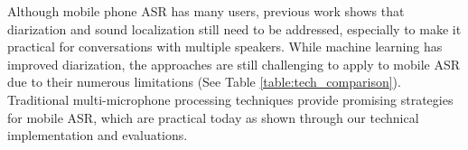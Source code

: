 Although mobile phone ASR has many users, previous work shows that diarization and sound localization still need to be addressed, especially to make it practical for conversations with multiple speakers. While machine learning has improved diarization, the approaches are still challenging to apply to mobile ASR due to their numerous limitations (See Table \ref{table:tech_comparison}). Traditional multi-microphone processing techniques provide promising strategies for mobile ASR, which are practical today as shown through our technical implementation and evaluations.







